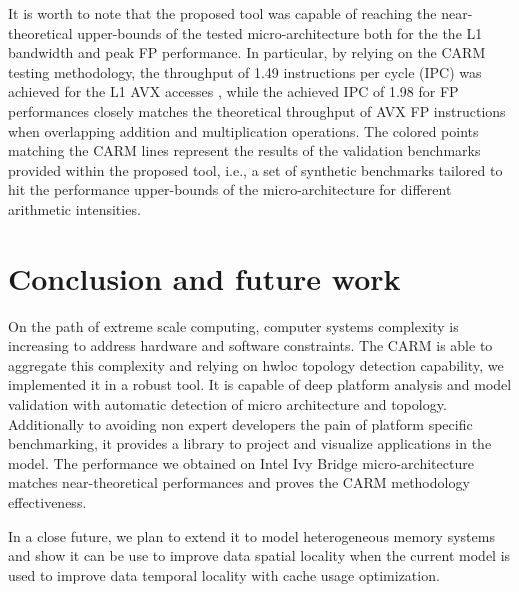 \documentclass[twoside,twocolumn,8pt]{extarticle}
\begin{document}
It is worth to note that the proposed tool was capable of reaching the near-theoretical upper-bounds of the tested
micro-architecture both for the the L1 bandwidth and peak FP performance.  In particular, by relying on the CARM testing
methodology,  the throughput of 1.49 instructions per cycle (IPC) was achieved for the  L1 AVX accesses , while the achieved IPC of
1.98 for FP performances closely matches the theoretical throughput of AVX FP instructions when overlapping addition and
multiplication operations. 
The colored points matching the CARM lines represent the results of the validation benchmarks provided within the proposed tool,
i.e., a set of synthetic benchmarks tailored to hit the performance upper-bounds of the micro-architecture for different
arithmetic intensities.

\section{Conclusion and future work}\label{sec:conclusion}

On the path of extreme scale computing, computer systems complexity is increasing to address hardware and software constraints.
The CARM is able to aggregate this complexity and relying on hwloc topology detection capability, we implemented it in a robust
tool. It is capable of deep platform analysis and model validation with automatic detection of micro architecture and topology.
Additionally to avoiding non expert developers the pain of platform specific benchmarking, it provides a library to project and
visualize applications in the model. The performance we obtained on Intel Ivy Bridge micro-architecture matches near-theoretical
performances and proves the CARM methodology effectiveness.

In a close future, we plan to extend it to model heterogeneous memory systems and show it can be use to improve data spatial
locality when the current model is used to improve data temporal locality with cache usage optimization.



\end{document}
